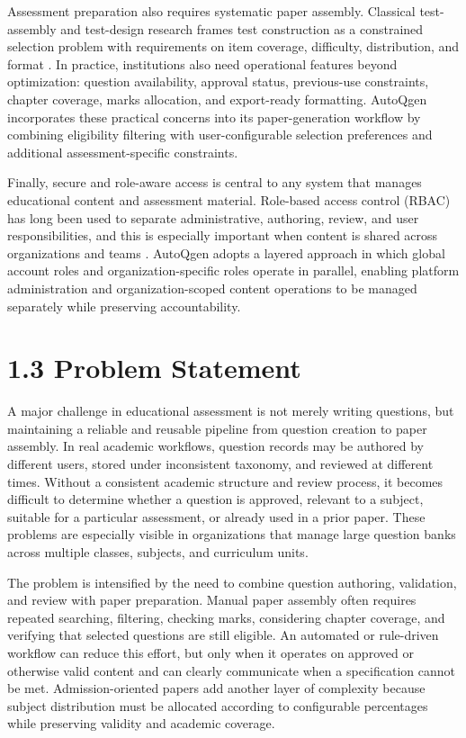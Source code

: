 Assessment preparation also requires systematic paper assembly. Classical test-assembly and test-design research frames test construction as a constrained selection problem with requirements on item coverage, difficulty, distribution, and format \cite{vanDerLinden2005,luo2020}. In practice, institutions also need operational features beyond optimization: question availability, approval status, previous-use constraints, chapter coverage, marks allocation, and export-ready formatting. AutoQgen incorporates these practical concerns into its paper-generation workflow by combining eligibility filtering with user-configurable selection preferences and additional assessment-specific constraints.

Finally, secure and role-aware access is central to any system that manages educational content and assessment material. Role-based access control (RBAC) has long been used to separate administrative, authoring, review, and user responsibilities, and this is especially important when content is shared across organizations and teams \cite{sandhu1996rbac,owaspAccessControl}. AutoQgen adopts a layered approach in which global account roles and organization-specific roles operate in parallel, enabling platform administration and organization-scoped content operations to be managed separately while preserving accountability.

\section{1.3 Problem Statement}

A major challenge in educational assessment is not merely writing questions, but maintaining a reliable and reusable pipeline from question creation to paper assembly. In real academic workflows, question records may be authored by different users, stored under inconsistent taxonomy, and reviewed at different times. Without a consistent academic structure and review process, it becomes difficult to determine whether a question is approved, relevant to a subject, suitable for a particular assessment, or already used in a prior paper. These problems are especially visible in organizations that manage large question banks across multiple classes, subjects, and curriculum units.

The problem is intensified by the need to combine question authoring, validation, and review with paper preparation. Manual paper assembly often requires repeated searching, filtering, checking marks, considering chapter coverage, and verifying that selected questions are still eligible. An automated or rule-driven workflow can reduce this effort, but only when it operates on approved or otherwise valid content and can clearly communicate when a specification cannot be met. Admission-oriented papers add another layer of complexity because subject distribution must be allocated according to configurable percentages while preserving validity and academic coverage.

